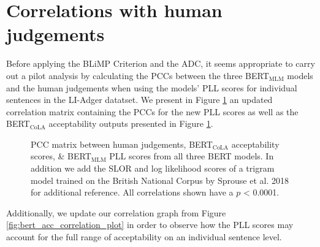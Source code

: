 \section{Correlations with human judgements}
Before applying the BLiMP Criterion and the ADC, it seems appropriate to carry out a pilot analysis by calculating the PCCs between the three BERT$_{\mathrm{MLM}}$ models and the human judgements when using the models' PLL scores for individual sentences in the LI-Adger datatset.  We present in Figure \ref{fig:bert_acc_pll_correlation_matrix} an updated correlation matrix containing the PCCs for the new PLL scores as well as the BERT$_{\mathrm{CoLA}}$ acceptability outputs presented in Figure \ref{fig:bert_acc_pll_correlation_matrix}.

\begin{figure}[h]
    \caption[PCC matrix between human judgements, BERT acceptability \newline \& PLL scores, and a trigram model]{PCC matrix between human judgements, BERT$_{\mathrm{CoLA}}$ acceptability scores, \& BERT$_{\mathrm{MLM}}$ PLL scores from all three BERT models.  In addition we add the SLOR and log likelihood scores of a trigram model trained on the British National Corpus by Sprouse et al. 2018 for additional reference.  All correlations shown have a $p$ < 0.0001.}
    \label{fig:bert_acc_pll_correlation_matrix}
\end{figure}


Additionally, we update our correlation graph from Figure \ref{fig:bert_acc_correlation_plot} in order to observe how the PLL scores may account for the full range of acceptability on an individual sentence level.

